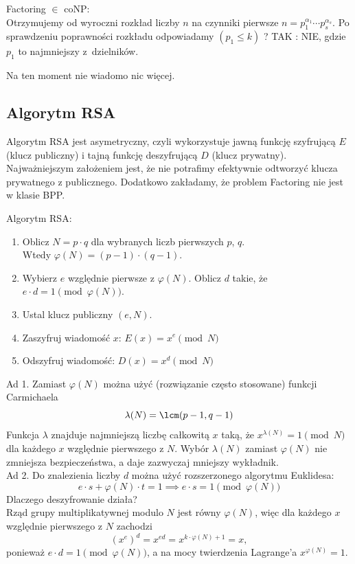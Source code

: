 Factoring \( \in \) coNP: \\
Otrzymujemy od wyroczni rozkład liczby \( n \) na czynniki pierwsze \( n = p_1^{\alpha_1} \cdots p_s^{\alpha_s} \). Po sprawdzeniu poprawności rozkładu odpowiadamy \( (p_1 \leq k) \) ? TAK : NIE, gdzie \( p_1 \) to najmniejszy z~dzielników.

Na ten moment nie wiadomo nic więcej.

\subsection{Algorytm RSA}
Algorytm RSA jest asymetryczny, czyli wykorzystuje jawną funkcję szyfrującą \( E \) (klucz publiczny) i tajną funkcję deszyfrującą \( D \) (klucz prywatny).
Najważniejszym założeniem jest, że nie potrafimy efektywnie odtworzyć klucza prywatnego z publicznego. Dodatkowo zakładamy, że problem Factoring nie jest w klasie BPP.

\begin{greyframe}
	Algorytm RSA:
	\begin{enumerate}
		\item Oblicz \( N = p \cdot q \) dla wybranych liczb pierwszych \( p \), \( q \). \\
		      Wtedy \( \varphi(N) = (p-1) \cdot (q-1) \).
		\item Wybierz \( e \) względnie pierwsze z \( \varphi(N) \). Oblicz \( d \) takie, że  \( e\cdot d = 1 \pmod{\varphi(N)} \).
		\item Ustal klucz publiczny \( (e, N) \).
		\item Zaszyfruj wiadomość \( x \): \( E(x) = x^e \pmod{N} \)
		\item Odszyfruj wiadomość: \( D(x) = x^d \pmod{N} \)
	\end{enumerate}
\end{greyframe}

Ad 1. Zamiast \( \varphi(N) \) można użyć (rozwiązanie często stosowane) funkcji Carmichaela
\[
	\lambda(N) = \lcm(p - 1, q - 1)
\]
Funkcja \( \lambda \) znajduje najmniejszą liczbę całkowitą \( x \) taką, że \( x^{\lambda(N)} = 1 \pmod{N} \) dla każdego \( x \) względnie pierwszego z \( N \).
Wybór \( \lambda(N) \) zamiast \( \varphi(N) \) nie zmniejsza bezpieczeństwa, a daje zazwyczaj mniejszy wykładnik. \\
Ad 2. Do znalezienia liczby \( d \) można użyć rozszerzonego algorytmu Euklidesa:
\[
	e \cdot s + \varphi(N) \cdot t = 1 \implies e \cdot s = 1 \pmod{\varphi(N)}
\]
Dlaczego deszyfrowanie działa? \\
Rząd grupy multiplikatywnej modulo \( N \) jest równy \( \varphi(N) \), więc dla każdego \( x \) względnie pierwszego z \( N \) zachodzi
\[
	(x^{e})^d = x^{ed} = x^{k \cdot \varphi(N) + 1} = x,
\]
ponieważ \( e \cdot d = 1 \pmod{\varphi(N)} \), a na mocy twierdzenia Lagrange'a \( x^{\varphi(N)} = 1 \).

